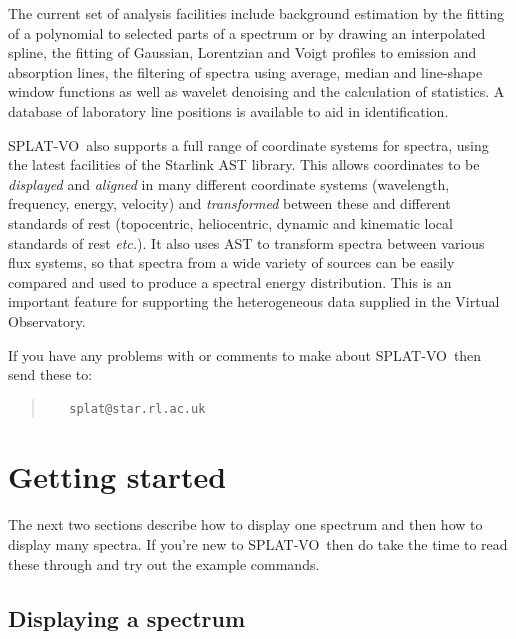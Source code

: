 \documentclass[twoside,11pt]{article}
\newcommand{\xref}[3]{#1}
\newcommand{\xlabel}[1]{}
\renewcommand{\_}{\texttt{\symbol{95}}}
\newcommand{\SPLAT}{\textsf{SPLAT-VO}}
\newcommand{\etc}{\textit{etc.}}
\begin{document}
The current set of analysis facilities include background estimation by the
fitting of a polynomial to selected parts of a spectrum or by drawing an
interpolated spline, the fitting of Gaussian, Lorentzian and Voigt profiles to
emission and absorption lines, the filtering of spectra using average,
median and line-shape window functions as well as wavelet denoising and
the calculation of statistics.
A database of laboratory line positions is available to aid in identification.

\SPLAT\ also supports a full range of coordinate systems for spectra,
using the latest facilities of the Starlink \xref{AST}{sun211}{}
library.
This allows coordinates to be \textit{displayed} and \textit{aligned}
in many different coordinate systems (wavelength, frequency, energy,
velocity) and \textit{transformed} between these and different
standards of rest (topocentric, heliocentric, dynamic and kinematic
local standards of rest \etc).
It also uses AST to transform spectra between various flux systems, so that
spectra from a wide variety of sources can be easily compared and used to
produce a spectral energy distribution.
This is an important feature for supporting the heterogeneous data supplied
in the Virtual Observatory.


If you have any problems with or comments to make about \SPLAT\, then send
these to:
\begin{quote}
\begin{verbatim}
   splat@star.rl.ac.uk
\end{verbatim}
\end{quote}


\section{Getting started\xlabel{getting_started}}

The next two sections describe how to display one spectrum and then
how to display many spectra. If you're new to \SPLAT\ then do take the
time to read these through and try out the example commands.

\newpage
\subsection{Displaying a spectrum}
\end{document}
